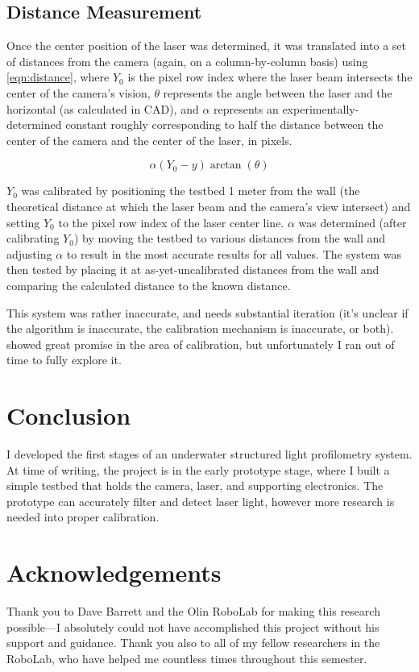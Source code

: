 \documentclass{article}
\begin{document}
\subsection{Distance Measurement} \label{sec:results:distance-measurement}

Once the center position of the laser was determined, it was translated into a set of distances from the camera (again, on a column-by-column basis) using \autoref{eqn:distance}, where $Y_0$ is the pixel row index where the laser beam intersects the center of the camera's vision, $\theta$ represents the angle between the laser and the horizontal (as calculated in CAD), and $\alpha$ represents an experimentally-determined constant roughly corresponding to half the distance between the center of the camera and the center of the laser, in pixels.

\begin{equation} \label{eqn:distance}
    \alpha\left(Y_0 - y\right)\arctan\left(\theta\right)
\end{equation}

$Y_0$ was calibrated by positioning the testbed 1 meter from the wall (the theoretical distance at which the laser beam and the camera's view intersect) and setting $Y_0$ to the pixel row index of the laser center line. $\alpha$ was determined (after calibrating $Y_0$) by moving the testbed to various distances from the wall and adjusting $\alpha$ to result in the most accurate results for all values. The system was then tested by placing it at as-yet-uncalibrated distances from the wall and comparing the calculated distance to the known distance.

This system was rather inaccurate, and needs substantial iteration (it's unclear if the algorithm is inaccurate, the calibration mechanism is inaccurate, or both). \cite{idrobo-pizo_calibration_2019} showed great promise in the area of calibration, but unfortunately I ran out of time to fully explore it.

\section{Conclusion} \label{sec:conclusion}

I developed the first stages of an underwater structured light profilometry system. At time of writing, the project is in the early prototype stage, where I built a simple testbed that holds the camera, laser, and supporting electronics. The prototype can accurately filter and detect laser light, however more research is needed into proper calibration. 

\section{Acknowledgements}

Thank you to Dave Barrett and the Olin RoboLab for making this research possible---I absolutely could not have accomplished this project without his support and guidance. Thank you also to all of my fellow researchers in the RoboLab, who have helped me countless times throughout this semester.

\medskip

\nocite{*}
\printbibliography
\end{document}
